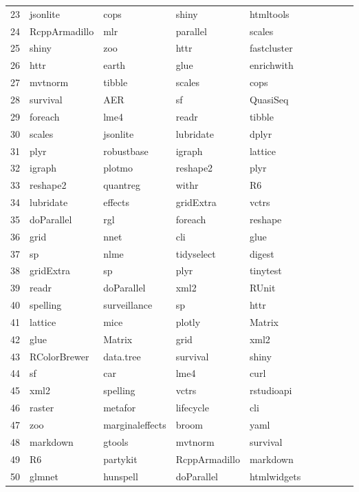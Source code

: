 \begin{table}[h]
\begin{center}
{\begin{tabular}{llllllllll}
 23 & jsonlite & cops & shiny & htmltools \\
 24 & RcppArmadillo & mlr & parallel & scales \\
 25 & shiny & zoo & httr & fastcluster \\
 26 & httr & earth & glue & enrichwith \\
 27 & mvtnorm & tibble & scales & cops \\
 28 & survival & AER & sf & QuasiSeq \\
 29 & foreach & lme4 & readr & tibble \\
 30 & scales & jsonlite & lubridate & dplyr \\
 31 & plyr & robustbase & igraph & lattice \\
 32 & igraph & plotmo & reshape2 & plyr \\
 33 & reshape2 & quantreg & withr & R6 \\
 34 & lubridate & effects & gridExtra & vctrs \\
 35 & doParallel & rgl & foreach & reshape \\
 36 & grid & nnet & cli & glue \\
 37 & sp & nlme & tidyselect & digest \\
 38 & gridExtra & sp & plyr & tinytest \\
 39 & readr & doParallel & xml2 & RUnit \\
 40 & spelling & surveillance & sp & httr \\
 41 & lattice & mice & plotly & Matrix \\
 42 & glue & Matrix & grid & xml2 \\
 43 & RColorBrewer & data.tree & survival & shiny \\
 44 & sf & car & lme4 & curl \\
 45 & xml2 & spelling & vctrs & rstudioapi \\
 46 & raster & metafor & lifecycle & cli \\
 47 & zoo & marginaleffects & broom & yaml \\
 48 & markdown & gtools & mvtnorm & survival \\
 49 & R6 & partykit & RcppArmadillo & markdown \\
 50 & glmnet & hunspell & doParallel & htmlwidgets \\
\bottomrule
\end{tabular}
}
\end{center}
\end{table}


